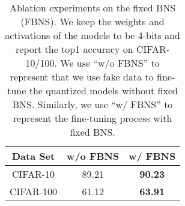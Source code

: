 \documentclass[runningheads]{llncs}
\def\new{\textcolor{black}}
\begin{document}
\begin{table}[t]
\tabcolsep=20pt
\begin{center}
\caption{Ablation experiments on the fixed BNS (FBNS). We keep the weights and activations of \new{the} models to be 4-bits and report the top1 accuracy on CIFAR-10/100. We use ``w/o FBNS'' to represent that we use fake data to fine-tune the quantized models without fixed BNS. Similarly, we use ``w/ FBNS'' to represent the fine-tuning process with fixed BNS.}
\label{tb:ablation_BN}
\begin{tabular}{ccc}
\hline
Data Set & w/o FBNS & w/ FBNS \\ \hline 
CIFAR-10          & 89.21         & \textbf{90.23}    \\ 
CIFAR-100         & 61.12         & \textbf{63.91}    \\ \hline
\end{tabular}
\end{center}
\end{table}
\end{document}
